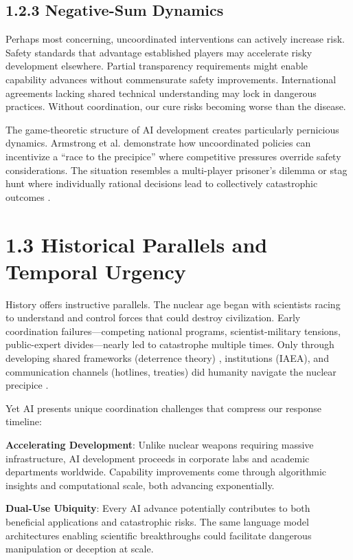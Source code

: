 \documentclass[
  11pt,
  letterpaper,
  openany]{book}
\begin{document}
\subsection{1.2.3 Negative-Sum Dynamics}\label{negative-sum-dynamics}

Perhaps most concerning, uncoordinated interventions can actively
increase risk. Safety standards that advantage established players may
accelerate risky development elsewhere. Partial transparency
requirements might enable capability advances without commensurate
safety improvements. International agreements lacking shared technical
understanding may lock in dangerous practices. Without coordination, our
cure risks becoming worse than the disease.

The game-theoretic structure of AI development creates particularly
pernicious dynamics. Armstrong et al. \textcite{armstrong2016}
demonstrate how uncoordinated policies can incentivize a ``race to the
precipice'' where competitive pressures override safety considerations.
The situation resembles a multi-player prisoner's dilemma or stag hunt
where individually rational decisions lead to collectively catastrophic
outcomes \textcite{samuel2023} \textcite{hunt2025}.

\section{1.3 Historical Parallels and Temporal
Urgency}\label{historical-parallels-and-temporal-urgency}

History offers instructive parallels. The nuclear age began with
scientists racing to understand and control forces that could destroy
civilization. Early coordination failures---competing national programs,
scientist-military tensions, public-expert divides---nearly led to
catastrophe multiple times. Only through developing shared frameworks
(deterrence theory) \textcite{schelling1960}, institutions (IAEA), and
communication channels (hotlines, treaties) did humanity navigate the
nuclear precipice \textcite{rehman2025}.

Yet AI presents unique coordination challenges that compress our
response timeline:

\textbf{Accelerating Development}: Unlike nuclear weapons requiring
massive infrastructure, AI development proceeds in corporate labs and
academic departments worldwide. Capability improvements come through
algorithmic insights and computational scale, both advancing
exponentially.

\textbf{Dual-Use Ubiquity}: Every AI advance potentially contributes to
both beneficial applications and catastrophic risks. The same language
model architectures enabling scientific breakthroughs could facilitate
dangerous manipulation or deception at scale.
\end{document}
